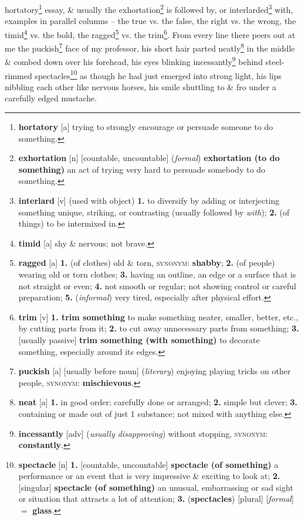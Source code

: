 \documentclass{article}
\begin{document}
hortatory\footnote{{\bf hortatory} [a] trying to strongly encourage or persuade someone to do something.} essay, \& usually the exhortation\footnote{{\bf exhortation} [n] [countable, uncountable] ({\it formal}) {\bf exhortation (to do something)} an act of trying very hard to persuade somebody to do something.} is followed by, or interlarded\footnote{{\bf interlard} [v] (used with object) {\bf 1.} to diversify by adding or interjecting something unique, striking, or contrasting (usually followed by {\it with}); {\bf 2.} (of things) to be intermixed in.} with, examples in parallel columns -- the true vs. the false, the right vs. the wrong, the timid\footnote{{\bf timid} [a] shy \& nervous; not brave.} vs. the bold, the ragged\footnote{{\bf ragged} [a] {\bf 1.} (of clothes) old \& torn, \textsc{synonym}: {\bf shabby}; {\bf 2.} (of people) wearing old or torn clothes; {\bf 3.} having an outline, an edge or a surface that is not straight or even; {\bf 4.} not smooth or regular; not showing control or careful preparation; {\bf 5.} ({\it informal}) very tired, especially after physical effort.} vs. the trim\footnote{{\bf trim} [v] {\bf 1. trim something} to make something neater, smaller, better, etc., by cutting parts from it; {\bf 2.} to cut away unnecessary parts from something; {\bf 3.} [usually passive] {\bf trim something (with something)} to decorate something, especially around its edges.}. From every line there peers out at me the puckish\footnote{{\bf puckish} [a] [usually before noun] ({\it literary}) enjoying playing tricks on other people, \textsc{synonym}: {\bf mischievous}.} face of my professor, his short hair parted neatly\footnote{{\bf neat} [a] {\bf 1.} in good order; carefully done or arranged; {\bf 2.} simple but clever; {\bf 3.} containing or made out of just 1 substance; not mixed with anything else.} in the middle \& combed down over his forehead, his eyes blinking incessantly\footnote{{\bf incessantly} [adv] ({\it usually disapproving}) without stopping, \textsc{synonym}: {\bf constantly}.} behind steel-rimmed spectacles\footnote{{\bf spectacle} [n] {\bf 1.} [countable, uncountable] {\bf spectacle (of something)} a performance or an event that is very impressive \& exciting to look at; {\bf 2.} [singular] {\bf spectacle (of something)} an unusual, embarrassing or sad sight or situation that attracts a lot of attention; {\bf 3.} ({\bf spectacles}) [plural] [{\it formal}] $=$ {\bf glass}.} as though he had just emerged into strong light, his lips nibbling each other like nervous horses, his smile shuttling to \& fro under a carefully edged mustache.
\end{document}
